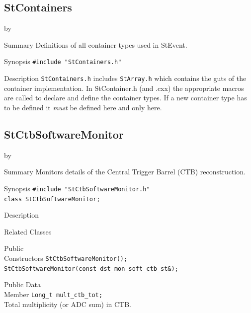 \documentclass[twoside]{article}
\newcommand{\StEvent}{\textsf{StEvent}}
\newcommand{\entrylabel}[1]{\mbox{\textbf{{#1}}}\hfil}%
\newenvironment{entry}
{\begin{list}{}%
    {\renewcommand{\makelabel}{\entrylabel}%
     \setlength{\labelwidth}{90pt}%
     \setlength{\leftmargin}{\labelwidth}
     \advance\leftmargin by \labelsep%
      }%
    }%
  {\end{list}}
\newcommand{\Entrylabel}[1]%
{\raisebox{0pt}[1ex][0pt]{\makebox[\labelwidth][l]%
    {\parbox[t]{\labelwidth}{\hspace{0pt}\textbf{{#1}}}}}}
\newenvironment{Entry}%
{\renewcommand{\entrylabel}{\Entrylabel}\begin{entry}}%
  {\end{entry}}
\begin{document}
\subsection{StContainers}
\label{sec:StContainers}
\begin{Entry}
\item[Summary] Definitions of all container types used in \StEvent.
\item[Synopsis]
    \verb+#include "StContainers.h"+\\
\item[Description] \texttt{StContainers.h} includes \texttt{StArray.h}
    which contains the guts of the container implementation. In
    StContainer.h (and .cxx) the appropriate macros are called to
    declare and define the container types. If a new container type
    has to be defined it \emph{must} be defined here and only here.
\end{Entry}
\clearpage


\subsection{StCtbSoftwareMonitor}
\label{sec:StCtbSoftwareMonitor}
\begin{Entry}
\item[Summary] Monitors details of the Central Trigger Barrel (CTB)
    reconstruction.
\item[Synopsis]
    \verb+#include "StCtbSoftwareMonitor.h"+\\
    \verb+class StCtbSoftwareMonitor;+\\
\item[Description]
\item[Related Classes]
\item[Public\\ Constructors]
    \verb+StCtbSoftwareMonitor();+\\

    \verb+StCtbSoftwareMonitor(const dst_mon_soft_ctb_st&);+\\
\item[Public Data\\ Member]
    \verb+Long_t mult_ctb_tot;+\\
    Total multiplicity (or ADC sum) in CTB.
\end{Entry}
\clearpage
\end{document}
